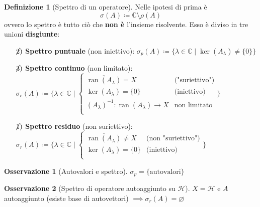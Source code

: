 \documentclass[a4paper,10pt]{article}
\theoremstyle{definition}
\DeclareMathOperator*{\ran}{ran}
\newcommand{\im}{\mathbb{C}} %
\newcommand{\hil}{\mathcal{H}} %
\theoremstyle{indentdefinition}
\newtheorem{defn}{Definizione}[section]
\theoremstyle{indenttheorem}
\theoremstyle{myremark}
\newtheorem*{rem*}{Osservazione}
\theoremstyle{indentgeneral}
\begin{document}
\begin{defn}[Spettro di un operatore]
    Nelle ipotesi di prima è 
    $$\sigma(A)\coloneqq\im\setminus\rho(A)$$
    ovvero lo spettro è tutto ciò che \textbf{non è} l'insieme risolvente. Esso è diviso in tre unioni \textbf{disgiunte}:
    \begin{itemize}
        \item[$\cancel{2})$] \textbf{Spettro puntuale} (non iniettivo): $\sigma_p(A)\coloneqq\{\lambda\in \im\mid \ker(A_\lambda)\ne\{0\}\}$
        \item[$\cancel{3})$] \textbf{Spettro continuo} (non limitato): $\sigma_c(A)\coloneqq\{\lambda\in\im\mid\begin{cases}
    \overline{\ran(A_\lambda)}=X & \text{("suriettivo")}\\
    \ker(A_\lambda)=\{0\} & \text{(iniettivo)}\\
    (A_\lambda)^{-1}:\ran(A_\lambda)\to X & \text{non limitato}\\
\end{cases}\}$
        \item[$\cancel{1})$]\textbf{Spettro residuo} (non suriettivo): $\sigma_r(A)\coloneqq\{\lambda\in \im\mid \begin{cases}
    \overline{\ran(A_\lambda)}\ne X & \text{(non "suriettivo")}\\
    \ker(A_\lambda)=\{0\} & \text{(iniettivo)}\\
\end{cases}\}$
    \end{itemize}
\end{defn}

\begin{rem*}[Autovalori e spettro]
    $\sigma_p=\{\text{autovalori}\}$
\end{rem*}

\begin{rem*}[Spettro di operatore autoaggiunto su $\hil$]
    $X=\hil$ e $A$ autoaggiunto (esiste base di autovettori) $\implies \sigma_r(A)=\varnothing$
\end{rem*}
\end{document}
